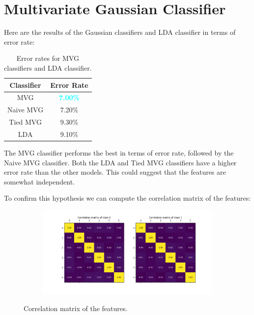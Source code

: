 \documentclass[12pt]{report}
\newcommand{\nnl}{%
    \newline
    \newline
}
\begin{document}
\section{Multivariate Gaussian Classifier}
Here are the results of the Gaussian classifiers and LDA classifier in terms of error rate:

\begin{table}[H]
    \centering
    \begin{tabular}{|c|c|}
        \hline
        \rowcolor{blue!10}
        \textbf{Classifier} & \textbf{Error Rate}               \\
        \hline
        MVG                 & \textcolor{cyan}{\textbf{7.00\%}} \\
        \hline
        Naive MVG           & 7.20\%                            \\
        \hline
        Tied MVG            & 9.30\%                            \\
        \hline
        LDA                 & 9.10\%                            \\
        \hline
    \end{tabular}
    \caption{Error rates for MVG classifiers and LDA classifier.}
    \label{tab:MVG_error}
\end{table}
\noindent
The MVG classifier performs the best in terms of error rate, followed by the Naive MVG classifier.
Both the LDA and Tied MVG classifiers have a higher error rate than the other models.
This could suggest that the features are somewhat independent.
\nnl
To confirm this hypothesis we can compute the correlation matrix of the features:
\begin{figure}[H]
    \centering
    \begin{subfigure}[t]{0.8\textwidth}
        \includegraphics[width=\textwidth]{./plot/MVG/correlation_matrix.png}
    \end{subfigure}
    \caption{Correlation matrix of the features.}
    \label{fig:correlation_matrix}
\end{figure}
\end{document}
